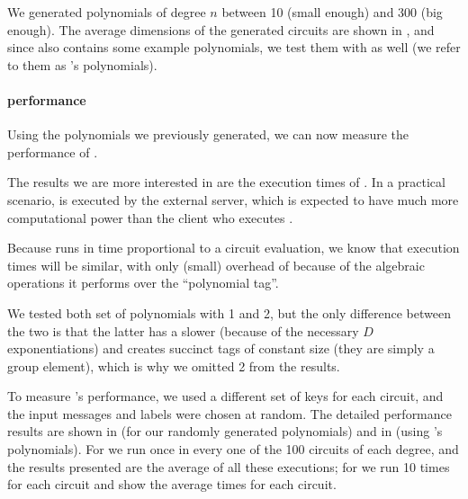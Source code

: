 We generated polynomials of degree $n$ between 10 (small enough) and 300 (big
enough). The average dimensions of the generated circuits are shown in
, and since 
also contains some example polynomials, we test them with
 as well (we refer to them as
's polynomials).



\paragraph*{ performance}
Using the polynomials we previously generated, we can now measure the
performance of .

The results we are more interested in are the execution times of \Eval.
In a practical scenario, \Eval is executed by the external server,
which is expected to have much more computational power than the client who
executes \Vrfy.

Because \Vrfy runs in time proportional to a circuit evaluation, we know that
execution times will be similar, with only (small) overhead of \Vrfy because of
the algebraic operations it performs over the ``polynomial tag''.

We tested both set of polynomials with 1 and
2, but the only difference between the two is
that the latter has a slower \KeyGen (because of the necessary $D$
exponentiations) and creates succinct tags of constant size (they are simply
a group element), which is why we omitted 2
from the results.

To measure 's performance, we used a different
set of keys for each circuit, and the input messages and labels were chosen at
random. The detailed performance results are shown in 
(for our randomly generated polynomials) and in
 (using
's polynomials). For
 we run  once in every
one of the 100 circuits of each degree, and the results presented are the
average of all these executions; for  we run
 10 times for each circuit and show the average
times for each circuit.

